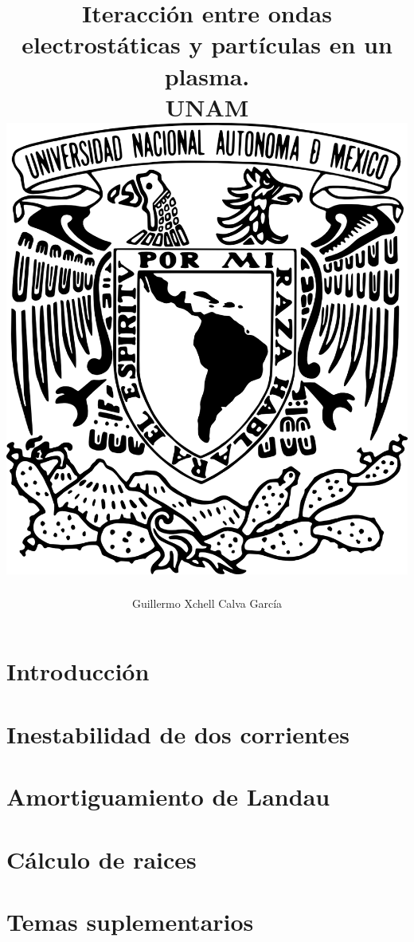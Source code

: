 \documentclass[12pt,letterpaper]{report}
\title{
	{Iteracción entre ondas electrostáticas y partículas en un plasma.}\\
	{\large UNAM}\\
	{\includegraphics{Escudo-UNAM-transparente.png}}
}
\author{Guillermo Xchell Calva García}
\date{}
\newcommand{\onlyinsubfile}[1]{#1}
\newcommand{\notinsubfile}[1]{}
\begin{document}
\renewcommand{\onlyinsubfile}[1]{}
\renewcommand{\notinsubfile}[1]{#1}
\maketitle
%
%
%

\tableofcontents
\listoffigures
{}
\selectfont
\chapter{Introducción}

\label{Ch1:Intro}
\chapter{Inestabilidad de dos corrientes}
\label{Ch2:inestabilidades}
\chapter{Amortiguamiento de Landau}\label{Ch3:Landau}


\appendix
\chapter{Cálculo de raices}
\label{Ap:raices}
\chapter{Temas suplementarios}
\label{Ap:transformadas}

\cleardoublepage{}
{}


\end{document}
